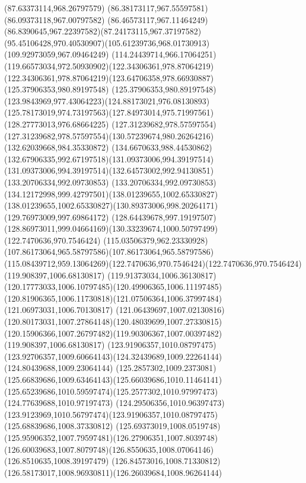 {{		\lineto(87.63373114,968.26797579)
		\lineto(86.38173117,967.55597581)
		\lineto(86.09373118,967.00797582)
		\curveto(86.46573117,967.11464249)(86.8390645,967.22397582)(87.24173115,967.37197582)
		\curveto(95.45106428,970.40530907)(105.61239736,968.01730913)(109.92973059,967.09464249)
		\curveto(114.24439714,966.17064251)(119.66573034,972.50930902)(122.34306361,978.87064219)
		\curveto(122.34306361,978.87064219)(123.64706358,978.66930887)(125.37906353,980.89197548)
		\curveto(125.37906353,980.89197548)(123.9843969,977.43064223)(124.88173021,976.08130893)
		\curveto(125.78173019,974.73197563)(127.84973014,975.71997561)(128.27773013,976.68664225)
		\lineto(127.31239682,978.57597554)
		\curveto(127.31239682,978.57597554)(130.57239674,980.26264216)(132.62039668,984.35330872)
		\curveto(134.6670633,988.44530862)(132.67906335,992.67197518)(131.09373006,994.39197514)
		\curveto(131.09373006,994.39197514)(132.64573002,992.94130851)(133.20706334,992.09730853)
		\curveto(133.20706334,992.09730853)(134.12172998,999.42797501)(138.01239655,1002.65330827)
		\curveto(138.01239655,1002.65330827)(130.89373006,998.20264171)(129.76973009,997.69864172)
		\curveto(128.64439678,997.19197507)(128.86973011,999.04664169)(130.33239674,1000.50797499)
		\moveto(122.7470636,970.7546424)
		\curveto(115.03506379,962.23330928)(107.86173064,965.58797586)(107.86173064,965.58797586)
		\curveto(115.08439712,959.13064269)(122.7470636,970.7546424)(122.7470636,970.7546424)
		\moveto(119.908397,1006.68130817)
		\curveto(119.91373034,1006.36130817)(120.17773033,1006.10797485)(120.49906365,1006.11197485)
		\curveto(120.81906365,1006.11730818)(121.07506364,1006.37997484)(121.06973031,1006.70130817)
		\curveto(121.06439697,1007.02130816)(120.80173031,1007.27864148)(120.48039699,1007.27330815)
		\curveto(120.15906366,1007.26797482)(119.90306367,1007.00397482)(119.908397,1006.68130817)
		\moveto(123.91906357,1010.08797475)
		\curveto(123.92706357,1009.60664143)(124.32439689,1009.22264144)(124.80439688,1009.23064144)
		\curveto(125.2857302,1009.2373081)(125.66839686,1009.63464143)(125.66039686,1010.11464141)
		\curveto(125.65239686,1010.59597474)(125.2577302,1010.97997473)(124.77639688,1010.97197473)
		\curveto(124.29506356,1010.96397473)(123.9123969,1010.56797474)(123.91906357,1010.08797475)
		\moveto(125.68839686,1008.37330812)
		\curveto(125.69373019,1008.0519748)(125.95906352,1007.79597481)(126.27906351,1007.8039748)
		\curveto(126.60039683,1007.8079748)(126.8550635,1008.07064146)(126.8510635,1008.39197479)
		\curveto(126.84573016,1008.71330812)(126.58173017,1008.96930811)(126.26039684,1008.96264144)
}}
